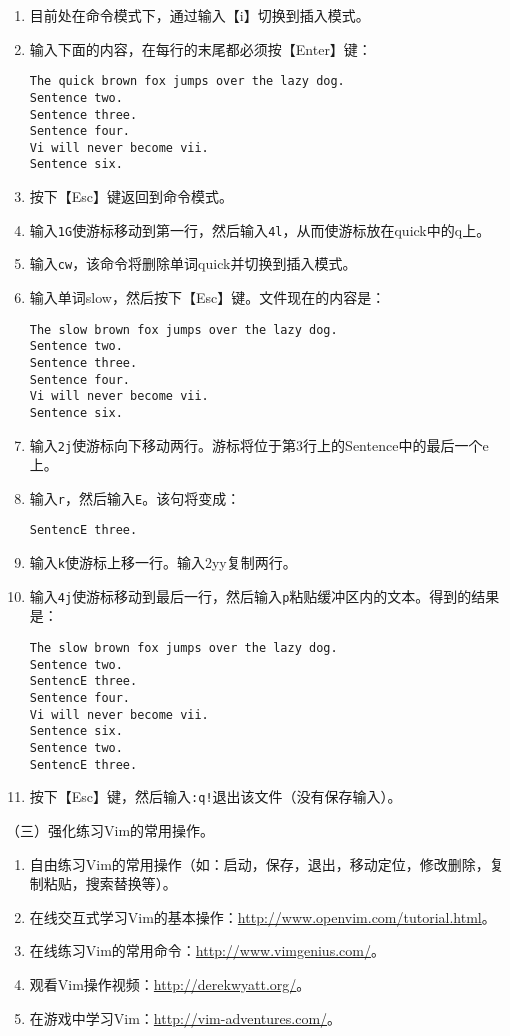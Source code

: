 \begin{enumerate}
\begin{enumerate}
      \item 目前处在命令模式下，通过输入【i】切换到插入模式。
      \item 输入下面的内容，在每行的末尾都必须按【Enter】键：
\begin{verbatim}
The quick brown fox jumps over the lazy dog.
Sentence two.
Sentence three.
Sentence four.
Vi will never become vii.
Sentence six.
\end{verbatim}
      \item 按下【Esc】键返回到命令模式。
      \item 输入\verb|1G|使游标移动到第一行，然后输入\verb|4l|，从而使游标放在quick中的q上。
      \item 输入\verb|cw|，该命令将删除单词quick并切换到插入模式。
      \item 输入单词slow，然后按下【Esc】键。文件现在的内容是：
\begin{verbatim}
The slow brown fox jumps over the lazy dog.
Sentence two.
Sentence three.
Sentence four.
Vi will never become vii.
Sentence six.
\end{verbatim}
      \item 输入\verb|2j|使游标向下移动两行。游标将位于第3行上的Sentence中的最后一个e上。
      \item 输入\verb|r|，然后输入\verb|E|。该句将变成：
\begin{verbatim}
SentencE three.
\end{verbatim}
      \item 输入\verb|k|使游标上移一行。输入2yy复制两行。
      \item 输入\verb|4j|使游标移动到最后一行，然后输入\verb|p|粘贴缓冲区内的文本。得到的结果是：
\begin{verbatim}
The slow brown fox jumps over the lazy dog.
Sentence two.
SentencE three.
Sentence four.
Vi will never become vii.
Sentence six.
Sentence two.
SentencE three.
\end{verbatim}
      \item 按下【Esc】键，然后输入\verb|:q!|退出该文件（没有保存输入）。
    \end{enumerate}
\end{enumerate}

\vspace{0.1in}
（三）强化练习Vim的常用操作。
\begin{enumerate}
  \item 自由练习Vim的常用操作（如：启动，保存，退出，移动定位，修改删除，复制粘贴，搜索替换等）。
  \item 在线交互式学习Vim的基本操作：\href{http://www.openvim.com/tutorial.html}{http://www.openvim.com/tutorial.html}。
  \item 在线练习Vim的常用命令：\href{http://www.vimgenius.com/}{http://www.vimgenius.com/}。
  \item 观看Vim操作视频：\href{http://derekwyatt.org/}{http://derekwyatt.org/}。
  \item 在游戏中学习Vim：\href{http://vim-adventures.com/}{http://vim-adventures.com/}。
\end{enumerate}

